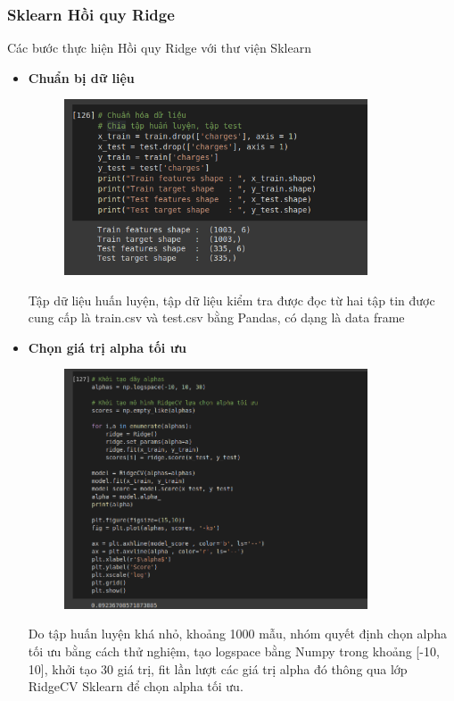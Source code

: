 \documentclass{article}
\begin{document}
	\subsubsection{Sklearn Hồi quy Ridge}
	Các bước thực hiện Hồi quy Ridge với thư viện Sklearn
	\begin{itemize}
		\item \textbf{Chuẩn bị dữ liệu}
		\begin{figure}[H]
			\centering
			\includegraphics[width=0.85\textwidth]{images/ridge_reg/ridge_reg_data_preparation.png}
		\end{figure}
		Tập dữ liệu huấn luyện, tập dữ liệu kiểm tra được đọc từ hai tập tin được cung cấp là train.csv và test.csv bằng Pandas, có dạng là data frame
		
		\item \textbf{Chọn giá trị alpha tối ưu}
		\begin{figure}[H]
			\centering
			\includegraphics[width=0.85\textwidth]{images/ridge_reg/ridge_reg_optimal_alpha.png}
		\end{figure}
		Do tập huấn luyện khá nhỏ, khoảng 1000 mẫu, nhóm quyết định chọn alpha tối ưu bằng cách thử nghiệm, tạo logspace bằng Numpy trong khoảng [-10, 10], khởi tạo 30 giá trị, fit lần lượt các giá trị alpha đó thông qua lớp RidgeCV Sklearn để chọn alpha tối ưu.
		

\end{itemize}
\end{document}
